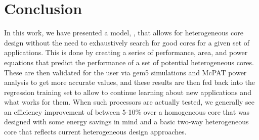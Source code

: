 \section{Conclusion}
\label{sec:conclusion}

In this work, we have presented a model, \blackBox{}, that allows for
heterogeneous core design without the need to exhaustively search for
good cores for a given set of applications. This is done by creating a
series of performance, area, and power equations that predict the
performance of a set of potential heterogeneous cores. These are then
validated for the user via gem5 simulations and McPAT power analysis
to get more accurate values, and these results are then fed back into
the regression training set to allow \blackBox{} to continue learning
about new applications and what works for them. When such processors
are actually tested, we generally see an efficiency improvement of
between 5-10\% over a homogeneous core that was designed with
some energy savings in mind and a basic two-way heterogeneous core
that reflects current heterogeneous design approaches.


